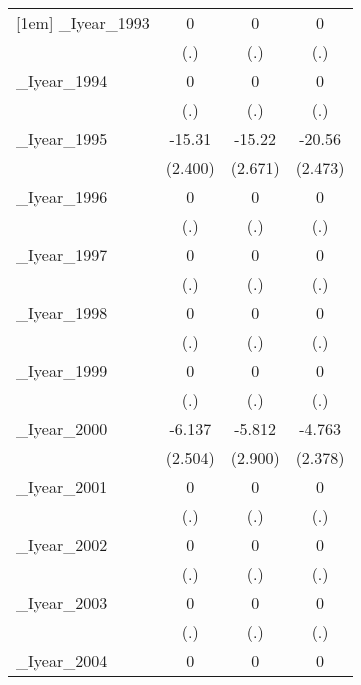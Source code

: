 \begin{table}[htbp]
\begin{tabular}{l*{3}{c}}
[1em]
\_Iyear\_1993&        0         &        0         &        0         \\
          &      (.)         &      (.)         &      (.)         \\
[1em]
\_Iyear\_1994&        0         &        0         &        0         \\
          &      (.)         &      (.)         &      (.)         \\
[1em]
\_Iyear\_1995&   -15.31\sym{***}&   -15.22\sym{***}&   -20.56\sym{***}\\
          &  (2.400)         &  (2.671)         &  (2.473)         \\
[1em]
\_Iyear\_1996&        0         &        0         &        0         \\
          &      (.)         &      (.)         &      (.)         \\
[1em]
\_Iyear\_1997&        0         &        0         &        0         \\
          &      (.)         &      (.)         &      (.)         \\
[1em]
\_Iyear\_1998&        0         &        0         &        0         \\
          &      (.)         &      (.)         &      (.)         \\
[1em]
\_Iyear\_1999&        0         &        0         &        0         \\
          &      (.)         &      (.)         &      (.)         \\
[1em]
\_Iyear\_2000&   -6.137\sym{**} &   -5.812\sym{**} &   -4.763\sym{**} \\
          &  (2.504)         &  (2.900)         &  (2.378)         \\
[1em]
\_Iyear\_2001&        0         &        0         &        0         \\
          &      (.)         &      (.)         &      (.)         \\
[1em]
\_Iyear\_2002&        0         &        0         &        0         \\
          &      (.)         &      (.)         &      (.)         \\
[1em]
\_Iyear\_2003&        0         &        0         &        0         \\
          &      (.)         &      (.)         &      (.)         \\
[1em]
\_Iyear\_2004&        0         &        0         &        0         \\

\end{tabular}
\end{table}
